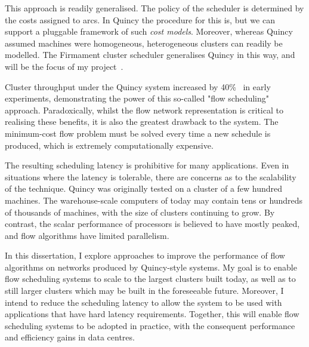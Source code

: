 This approach is readily generalised. The policy of the scheduler is determined by the costs assigned to arcs. In Quincy the procedure for this is, but we can support a pluggable framework of such \emph{cost models}. Moreover, whereas Quincy assumed machines were homogeneous, heterogeneous clusters can readily be modelled\footnotemark. The Firmament cluster scheduler generalises Quincy in this way, and will be the focus of my project\footnotemark~\cite{Schwarzkopf:2015}. 

Cluster throughput under the Quincy system increased by 40\%~\cite{Isard:2009} in early experiments, demonstrating the power of this so-called "flow scheduling" approach. Paradoxically, whilst the flow network representation is critical to realising these benefits, it is also the greatest drawback to the system. The minimum-cost flow problem must be solved every time a new schedule is produced, which is extremely computationally expensive.

The resulting scheduling latency is prohibitive for many applications. Even in situations where the latency is tolerable, there are concerns as to the scalability of the technique. Quincy was originally tested on a cluster of a few hundred machines. The warehouse-scale computers of today may contain tens or hundreds of thousands of machines, with the size of clusters continuing to grow. By contrast, the scalar performance of processors is believed to have mostly peaked, and flow algorithms have limited parallelism.

In this dissertation, I explore approaches to improve the performance of flow algorithms on networks produced by Quincy-style systems. My goal is to enable flow scheduling systems to scale to the largest clusters built today, as well as to still larger clusters which may be built in the foreseeable future. Moreover, I intend to reduce the scheduling latency to allow the system to be used with applications that have hard latency requirements. Together, this will enable flow scheduling systems to be adopted in practice, with the consequent performance and efficiency gains in data centres.

